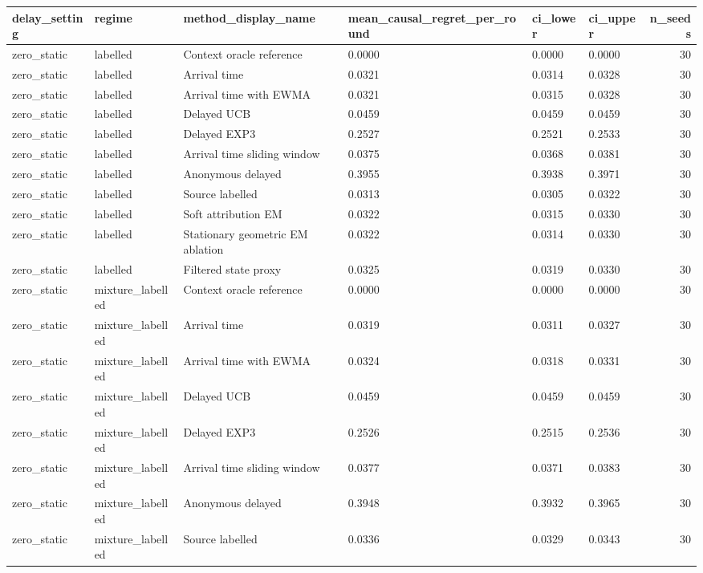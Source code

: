 \begin{tabular}{llllllr}
\toprule
delay\_setting & regime & method\_display\_name & mean\_causal\_regret\_per\_round & ci\_lower & ci\_upper & n\_seeds \\
\midrule
zero\_static & labelled & Context oracle reference & 0.0000 & 0.0000 & 0.0000 & 30 \\
zero\_static & labelled & Arrival time & 0.0321 & 0.0314 & 0.0328 & 30 \\
zero\_static & labelled & Arrival time with EWMA & 0.0321 & 0.0315 & 0.0328 & 30 \\
zero\_static & labelled & Delayed UCB & 0.0459 & 0.0459 & 0.0459 & 30 \\
zero\_static & labelled & Delayed EXP3 & 0.2527 & 0.2521 & 0.2533 & 30 \\
zero\_static & labelled & Arrival time sliding window & 0.0375 & 0.0368 & 0.0381 & 30 \\
zero\_static & labelled & Anonymous delayed & 0.3955 & 0.3938 & 0.3971 & 30 \\
zero\_static & labelled & Source labelled & 0.0313 & 0.0305 & 0.0322 & 30 \\
zero\_static & labelled & Soft attribution EM & 0.0322 & 0.0315 & 0.0330 & 30 \\
zero\_static & labelled & Stationary geometric EM ablation & 0.0322 & 0.0314 & 0.0330 & 30 \\
zero\_static & labelled & Filtered state proxy & 0.0325 & 0.0319 & 0.0330 & 30 \\
zero\_static & mixture\_labelled & Context oracle reference & 0.0000 & 0.0000 & 0.0000 & 30 \\
zero\_static & mixture\_labelled & Arrival time & 0.0319 & 0.0311 & 0.0327 & 30 \\
zero\_static & mixture\_labelled & Arrival time with EWMA & 0.0324 & 0.0318 & 0.0331 & 30 \\
zero\_static & mixture\_labelled & Delayed UCB & 0.0459 & 0.0459 & 0.0459 & 30 \\
zero\_static & mixture\_labelled & Delayed EXP3 & 0.2526 & 0.2515 & 0.2536 & 30 \\
zero\_static & mixture\_labelled & Arrival time sliding window & 0.0377 & 0.0371 & 0.0383 & 30 \\
zero\_static & mixture\_labelled & Anonymous delayed & 0.3948 & 0.3932 & 0.3965 & 30 \\
zero\_static & mixture\_labelled & Source labelled & 0.0336 & 0.0329 & 0.0343 & 30 \\

\end{tabular}
